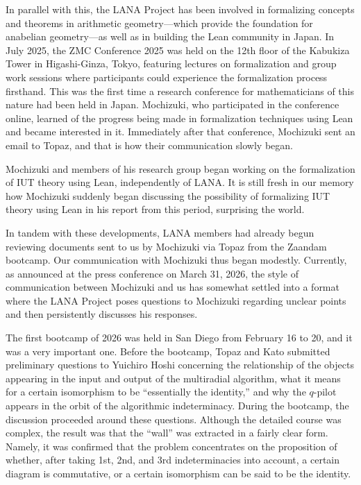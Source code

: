 \documentclass[12pt, reqno, a4paper]{amsart}
\begin{document}
In parallel with this, the LANA Project has been involved in formalizing concepts and theorems in arithmetic geometry---which provide the foundation for anabelian geometry---as well as in building the Lean community in Japan. In July 2025, the ZMC Conference 2025 was held on the 12th floor of the Kabukiza Tower in Higashi-Ginza, Tokyo, featuring lectures on formalization and group work sessions where participants could experience the formalization process firsthand. This was the first time a research conference for mathematicians of this nature had been held in Japan. Mochizuki, who participated in the conference online, learned of the progress being made in formalization techniques using Lean and became interested in it. Immediately after that conference, Mochizuki sent an email to Topaz, and that is how their communication slowly began.

Mochizuki and members of his research group began working on the formalization of IUT theory using Lean, independently of LANA. It is still fresh in our memory how Mochizuki suddenly began discussing the possibility of formalizing IUT theory using Lean in his report \cite{Mochizuki2025IUT} from this period, surprising the world.

In tandem with these developments, LANA members had already begun reviewing documents sent to us by Mochizuki via Topaz from the Zaandam bootcamp. Our communication with Mochizuki thus began modestly. Currently, as announced at the press conference on March 31, 2026, the style of communication between Mochizuki and us has somewhat settled into a format where the LANA Project poses questions to Mochizuki regarding unclear points and then persistently discusses his responses.


The first bootcamp of 2026 was held in San Diego from February 16 to 20, and it was a very important one. Before the bootcamp, Topaz and Kato submitted preliminary questions to Yuichiro Hoshi concerning the relationship of the objects appearing in the input and output of the multiradial algorithm, what it means for a certain isomorphism to be ``essentially the identity,'' and why the $q$-pilot appears in the orbit of the algorithmic indeterminacy. During the bootcamp, the discussion proceeded around these questions. Although the detailed course was complex, the result was that the ``wall'' was extracted in a fairly clear form. Namely, it was confirmed that the problem concentrates on the proposition of whether, after taking 1st, 2nd, and 3rd indeterminacies into account, a certain diagram is commutative, or a certain isomorphism can be said to be the identity.
\end{document}
